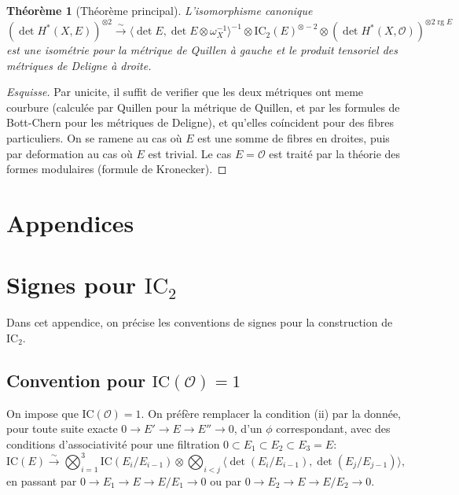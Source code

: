 \documentclass[11pt,a4paper]{article}
\theoremstyle{plain}
\newtheorem{theorem}{Th\'eor\`eme}[section]
\theoremstyle{definition}
\DeclareMathOperator{\rg}{rg}
\newcommand{\IC}{\mathrm{IC}}
\newcommand{\cO}{\mathcal{O}}
\begin{document}
\begin{theorem}[Th\'eor\`eme principal]
L'isomorphisme canonique
\begin{equation}
(\det H^*(X, E))^{\otimes 2} \xrightarrow{\sim} \langle \det E, \det E \otimes \omega_X^{-1} \rangle^{-1} \otimes \IC_2(E)^{\otimes -2} \otimes (\det H^*(X, \cO))^{\otimes 2 \rg E}
\end{equation}
est une isom\'etrie pour la m\'etrique de Quillen \`a gauche et le produit tensoriel des m\'etriques de Deligne \`a droite.
\end{theorem}

\begin{proof}[Esquisse]
Par unicite, il suffit de verifier que les deux m\'etriques ont meme courbure (calcul\'ee par Quillen pour la m\'etrique de Quillen, et par les formules de Bott-Chern pour les m\'etriques de Deligne), et qu'elles co\'incident pour des fibres particuliers. On se ramene au cas o\`u $E$ est une somme de fibres en droites, puis par deformation au cas o\`u $E$ est trivial. Le cas $E = \cO$ est trait\'e par la th\'eorie des formes modulaires (formule de Kronecker).
\end{proof}

\newpage

\appendix

\section*{Appendices}

\section{Signes pour $\IC_2$}

Dans cet appendice, on pr\'ecise les conventions de signes pour la construction de $\IC_2$.

\subsection{Convention pour $\IC(\cO) = 1$}
On impose que $\IC(\cO) = 1$. On pr\'ef\`ere remplacer la condition (ii) par la donn\'ee, pour toute suite exacte $0 \to E' \to E \to E'' \to 0$, d'un $\phi$ correspondant, avec des conditions d'associativit\'e pour une filtration $0 \subset E_1 \subset E_2 \subset E_3 = E$:
\begin{equation}
\IC(E) \xrightarrow{\sim} \bigotimes_{i=1}^{3} \IC(E_i/E_{i-1}) \otimes \bigotimes_{i<j} \langle \det(E_i/E_{i-1}), \det(E_j/E_{j-1}) \rangle,
\end{equation}
en passant par $0 \to E_1 \to E \to E/E_1 \to 0$ ou par $0 \to E_2 \to E \to E/E_2 \to 0$.
\end{document}
